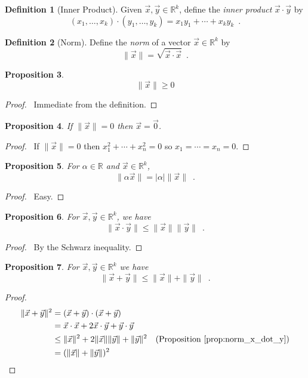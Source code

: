 \documentclass{book}
\let\qed\relax
\newtheorem{prop}{Proposition}[chapter]
\theoremstyle{definition}
\newtheorem{df}[prop]{Definition}
\begin{document}
\begin{df}[Inner Product]
Given $\vec{x}, \vec{y} \in \mathbb{R}^k$, define the \emph{inner product} $\vec{x} \cdot \vec{y}$ by
\[ (x_1, \ldots, x_k) \cdot (y_1, \ldots, y_k) = x_1 y_1 + \cdots + x_k y_k \enspace . \]
\end{df}

\begin{df}[Norm]
Define the \emph{norm} of a vector $\vec{x} \in \mathbb{R}^k$ by
\[ \|\vec{x}\| = \sqrt{\vec{x} \cdot \vec{x}} \enspace . \]
\end{df}

\begin{prop}
\[ \|\vec{x}\| \geq 0 \]
\end{prop}

\begin{proof}
\pf\ Immediate from the definition. \qed
\end{proof}

\begin{prop}
If $\|\vec{x}\| = 0$ then $\vec{x} = \vec{0}$.
\end{prop}

\begin{proof}
\pf\ If $\|\vec{x}\| = 0$ then $x_1^2 + \cdots + x_n^2 = 0$ so $x_1 = \cdots = x_n = 0$. \qed
\end{proof}

\begin{prop}
For $\alpha \in \mathbb{R}$ and $\vec{x} \in \mathbb{R}^k$,
\[ \| \alpha \vec{x} \| = |\alpha| \| \vec{x} \| \enspace . \]
\end{prop}

\begin{proof}
\pf\ Easy. \qed
\end{proof}

\begin{prop}
\label{prop:norm_x_dot_y}
For $\vec{x}, \vec{y} \in \mathbb{R}^k$, we have
\[ \| \vec{x} \cdot \vec{y} \| \leq \| \vec{x} \| \| \vec{y} \| \enspace . \]
\end{prop}

\begin{proof}
\pf\ By the Schwarz inequality. \qed
\end{proof}

\begin{prop}
For $\vec{x}, \vec{y} \in \mathbb{R}^k$ we have
\[ \| \vec{x} + \vec{y} \| \leq \| \vec{x} \| + \| \vec{y} \| \enspace . \]
\end{prop}

\begin{proof}
\pf
\begin{align*}
\| \vec{x} + \vec{y} \|^2 & = (\vec{x} + \vec{y}) \cdot (\vec{x} + \vec{y}) \\
& = \vec{x} \cdot \vec{x} + 2 \vec{x} \cdot \vec{y} + \vec{y} \cdot \vec{y} \\
& \leq \| \vec{x} \|^2 + 2 \| \vec{x} \| \| \vec{y} \| + \| \vec{y} \|^2 & (\text{Proposition \ref{prop:norm_x_dot_y}}) \\
& = (\| \vec{x} \| + \| \vec{y} \|)^2 & \qed
\end{align*}
\end{proof}
\end{document}
